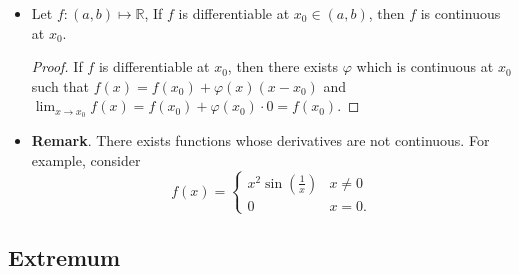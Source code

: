 \documentclass{article}
\newcommand{\R}{\mathbb{R}}
\newcommand{\?}{\stackrel{?}{=}}
\theoremstyle{definition} %
\begin{document}
\begin{itemize}
\begin{proof}
\begin{align*}
            &\rightarrow f'(x_0) = \varphi(x_0).
        \end{align*}
        Next, suppose $f'(x_0)$ is well-defined. In particular, set
        \[
        \varphi = \begin{cases}
            \frac{f(x) - f(x_0)}{x - x_0} & x \neq x_0 \\
            f'(x_0) & x = x_0.
        \end{cases}
        \]
        Clearly, $\varphi(x)$ is continuous at $x_0$, so
        $$\lim_{x \to x_0} \varphi(x) = \lim_{x \to x_0} \frac{f(x) - f(x_0)}{x - x_0} = f'(x_0) = \varphi(x_0).$$
        On the other hand, when $x \neq x_0$, we have
        \begin{alignat*}{2}
            && \varphi(x) &= \frac{f(x) - f(x_0)}{x - x_0} \\
            \iff&& f(x) &= f(x_0) + \varphi(x_0)(x - x_0) \\
            \iff&& f(x) &= f(x_0) + \varphi(x)(x - x_0).
        \end{alignat*}
    \end{proof}
    \item[]
    \begin{lemma}
        Let $f: (a, b) \mapsto \R$, If $f$ is differentiable at $x_0 \in (a, b)$, then $f$ is continuous at $x_0$.
    \end{lemma}
    \begin{proof}
        If $f$ is differentiable at $x_0$, then there exists $\varphi$ which is continuous at $x_0$ such that $f(x) = f(x_0) + \varphi(x)(x - x_0)$ and $\lim_{x \to x_0} f(x) = f(x_0) + \varphi(x_0) \cdot 0 = f(x_0)$.
    \end{proof}
    \item \textbf{Remark}. There exists functions whose derivatives are not continuous. For example, consider
    \[
    f(x) =
    \begin{cases}
        x^2 \sin\left(\frac{1}{x}\right) & x \neq 0 \\
        0 & x = 0.
    \end{cases}
    \]
\end{itemize}

\subsection{Extremum}
\end{document}
